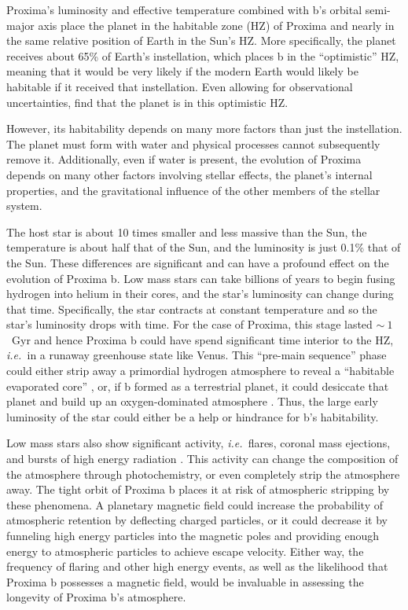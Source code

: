 \documentclass[preprint,12pt]{aastex}
\def\eg{{\it e.g.\ }}
\def\ie{{\it i.e.\ }}
\begin{document}
Proxima's luminosity and effective temperature combined with b's
orbital semi-major axis place the planet in the habitable zone (HZ) of
Proxima and nearly in the same relative position of Earth in the Sun's
HZ. More specifically, the planet receives about 65\% of Earth's
instellation, which places b in the ``optimistic'' HZ, meaning that it
would be very likely if the modern Earth would likely be habitable if
it received that instellation. Even allowing for observational
uncertainties, \cite{AngladaEscude16} find that the planet is in this
optimistic HZ.

However, its habitability depends on many more factors than just the
instellation. The planet must form with water and physical processes
cannot subsequently remove it. Additionally, even if water is present,
the evolution of Proxima depends on many other factors involving
stellar effects, the planet's internal properties, and the
gravitational influence of the other members of the stellar system.

The host star is about 10 times smaller and less massive than the Sun,
the temperature is about half that of the Sun, and the luminosity is
just 0.1\% that of the Sun. These differences are significant and can
have a profound effect on the evolution of Proxima b. Low mass stars
can take billions of years to begin fusing hydrogen into helium in
their cores, and the star's luminosity can change during that
time. Specifically, the star contracts at constant temperature and so
the star's luminosity drops with time. For the case of Proxima, this
stage lasted $\sim~1$~Gyr \cite{Baraffe15} and hence Proxima b
could have spend significant time interior to the HZ, \ie in a runaway
greenhouse state like Venus. This ``pre-main sequence'' phase could
either strip away a primordial hydrogen atmosphere to reveal a
``habitable evaporated core'' \citep{Luger15}, or, if b formed as a
terrestrial planet, it could desiccate that planet and build up an
oxygen-dominated atmosphere \citep{LugerBarnes15}. Thus, the large
early luminosity of the star could either be a help or hindrance for
b's habitability.

Low mass stars also show significant activity, \ie flares, coronal
mass ejections, and bursts of high energy radiation
\citep[\eg][]{West08}. This activity can change the composition of the
atmosphere through photochemistry, or even completely strip the
atmosphere away. The tight orbit of Proxima b places it at risk of
atmospheric stripping by these phenomena. A planetary magnetic field
could increase the probability of atmospheric retention by deflecting
charged particles, or it could decrease it by funneling high energy
particles into the magnetic poles and providing enough energy to
atmospheric particles to achieve escape velocity. Either way, the
frequency of flaring and other high energy events, as well as the
likelihood that Proxima b possesses a magnetic field, would be
invaluable in assessing the longevity of Proxima b's atmosphere.
\end{document}
